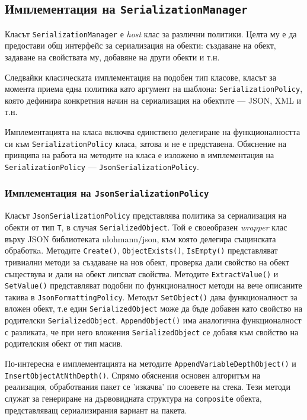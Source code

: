 \documentclass[12pt,a4paper,oneside]{book}
\begin{document}
\subsection{Имплементация на \texttt{SerializationManager}}

Класът \texttt{SerializationManager} е \textit{host} клас за различни политики.
Целта му е да предостави общ интерфейс за сериализация на обекти:
създаване на обект, задаване на свойствата му, добавяне на други обекти и т.н.

Следвайки класическата имплементация на подобен тип класове, класът за момента
приема една политика като аргумент на шаблона: \texttt{SerializationPolicy},
която дефинира конкретния начин на сериализация на обектите --- JSON, XML и т.н.

Имплементацията на класа включва единствено делегиране на функционалността си към
\texttt{SerializationPolicy} класа, затова и не е представена. Обяснение на
принципа на работа на методите на класа е изложено в
имплементация на \texttt{SerializationPolicy} ---
\texttt{JsonSerializationPolicy}.

\subsubsection{Имплементация на \texttt{JsonSerializationPolicy}}

Класът \texttt{JsonSerializationPolicy} представлява политика за сериализация на
обекти от тип \texttt{T}, в случая \texttt{SerializedObject}. Той е своеобразен
\textit{wrapper} клас върху JSON библиотеката nlohmann/json, към която
делегира същинската обработкa. Методите \texttt{Create()}, \texttt{ObjectExists()}, \texttt{IsEmpty()}
представляват тривиални методи за създаване на нов обект, проверка дали
свойство на обект съществува и дали на обект липсват свойства. Методите
\texttt{ExtractValue()} и \texttt{SetValue()} представляват подобни по
функционалност методи на вече описаните такива в \texttt{JsonFormattingPolicy}.
Методът \texttt{SetObject()} дава функционалност за вложен обект, т.е един
\texttt{SerializedObject} може да бъде добавен като свойство на родителски
\texttt{SerializedObject}.  \texttt{AppendObject()} има аналогична
функционалност с разликата, че при него вложения \texttt{SerializedObject} се
добавя към свойство на родителския обект от тип масив.

По-интересна е имплементацията на методите \texttt{AppendVariableDepthObject()} и
\texttt{InsertObjectAtNthDepth()}. Спрямо обяснения основен алгоритъм на
реализация, обработвания пакет се 'изкачва' по слоевете на стека. Тези методи
служат за генериране на дървовидната структура на \texttt{composite} обекта,
представляващ сериализирания вариант на пакета.
\end{document}
